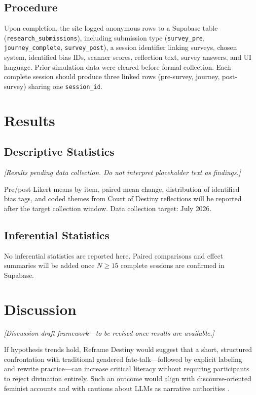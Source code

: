 \documentclass[stu,12pt,floatsintext]{apa7}
\begin{document}
\subsection{Procedure}

Upon completion, the site logged anonymous rows to a Supabase table (\texttt{research\_submissions}), including submission type (\texttt{survey\_pre}, \texttt{journey\_complete}, \texttt{survey\_post}), a session identifier linking surveys, chosen system, identified bias IDs, scanner scores, reflection text, survey answers, and UI language. Prior simulation data were cleared before formal collection. Each complete session should produce three linked rows (pre-survey, journey, post-survey) sharing one \texttt{session\_id}.

\section{Results}

\subsection{Descriptive Statistics}

\textit{[Results pending data collection. Do not interpret placeholder text as findings.]}

Pre/post Likert means by item, paired mean change, distribution of identified bias tags, and coded themes from Court of Destiny reflections will be reported after the target collection window. Data collection target: July 2026.

\subsection{Inferential Statistics}

No inferential statistics are reported here. Paired comparisons and effect summaries will be added once $N \geq 15$ complete sessions are confirmed in Supabase.

\section{Discussion}

\textit{[Discussion draft framework---to be revised once results are available.]}

If hypothesis trends hold, Reframe Destiny would suggest that a short, structured confrontation with traditional gendered fate-talk---followed by explicit labeling and rewrite practice---can increase critical literacy without requiring participants to reject divination entirely. Such an outcome would align with discourse-oriented feminist accounts \parencite{butler1990,foucault1972} and with cautions about LLMs as narrative authorities \parencite{bender2021}.
\end{document}
